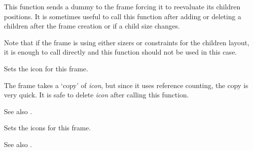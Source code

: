 
This function sends a dummy  to the frame
forcing it to reevaluate its children positions. It is sometimes useful to call
this function after adding or deleting a children after the frame creation or
if a child size changes.

Note that if the frame is using either sizers or constraints for the children
layout, it is enough to call  directly and
this function should not be used in this case.

\label{wxframeseticon}


Sets the icon for this frame.




The frame takes a `copy' of {\it icon}, but since it uses reference
counting, the copy is very quick. It is safe to delete {\it icon} after
calling this function.

See also .

\label{wxframeseticons}


Sets the icons for this frame.



See also .

%
%
%
%
%
%

